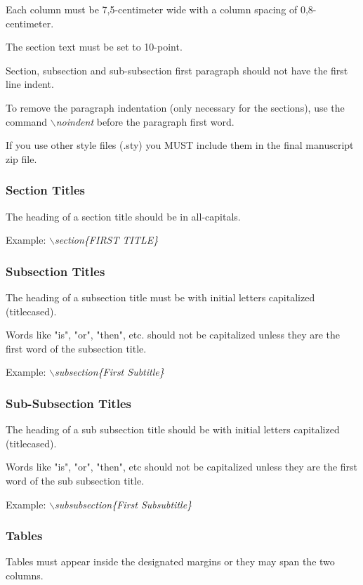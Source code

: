 \documentclass[a4paper,twoside]{article}
\begin{document}
Each column must be 7,5-centimeter wide with a column spacing of 0,8-centimeter.

The section text must be set to 10-point.

Section, subsection and sub-subsection first paragraph should not have the first line indent.

To remove the paragraph indentation (only necessary for the sections), use the command \textit{$\backslash$noindent} before the paragraph first word.

If you use other style files (.sty) you MUST include them in the final manuscript zip file.


\subsubsection{Section Titles}

The heading of a section title should be in all-capitals.

Example: \textit{$\backslash$section\{FIRST TITLE\}}

\subsubsection{Subsection Titles}

The heading of a subsection title must be with initial letters capitalized (titlecased).

Words like "is", "or", "then", etc. should not be capitalized unless they are the first word of the subsection title.

Example: \textit{$\backslash$subsection\{First Subtitle\}}

\subsubsection{Sub-Subsection Titles}

The heading of a sub subsection title should be with initial letters capitalized (titlecased).

Words like "is", "or", "then", etc should not be capitalized unless they are the first word of the sub subsection title.

Example: \textit{$\backslash$subsubsection\{First Subsubtitle\}}

\subsubsection{Tables}

Tables must appear inside the designated margins or they may span the two columns.
\end{document}
